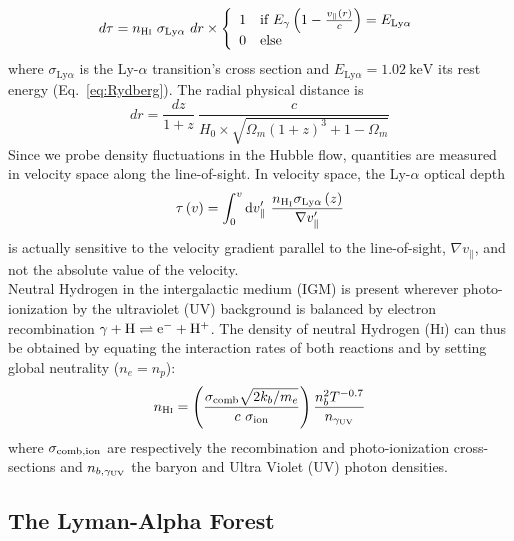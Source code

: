 \begin{equation}
\label{eq:beertlambert}
d\tau = n_{\mathrm{\textsc{Hi}}} ~\sigma_{\mathrm{Ly}\alpha} ~dr \times  \left\{
\begin{array}{ll}
1 & \text{if}~E_\gamma \left( 1 - \frac{v_\parallel (r)}{c} \right) = E_{\mathrm{Ly}\alpha} \\
0 & \text{else}
\end{array}
\right.
\end{equation} where $\sigma_{\mathrm{Ly}\alpha}$ is the Ly-$\alpha$ transition's cross section and $E_{\mathrm{Ly}\alpha} = 1.02~\mathrm{keV}$ its rest energy (Eq.~\ref{eq:Rydberg}). The radial physical distance is 
\begin{equation}
\label{eq:drdzbl}
dr = \frac{dz}{1+z}~\frac{c}{H_0 \times \sqrt{\Omega_m (1+z)^3 + 1 - \Omega_m}}
\end{equation} Since we probe density fluctuations in the Hubble flow, quantities are measured in velocity space along the line-of-sight. In velocity space, the Ly-$\alpha$ optical depth
\begin{equation}
	\tau \left(v\right) = \int_{0}^{v} \mathrm{d}v'_{\parallel} ~ \frac{n_{\rm{H_I}} \sigma_{\rm{Ly}\alpha}\left(z\right)}{\nabla v'_{\parallel}}
		\label{eq:tau}
\end{equation} is actually sensitive to the velocity gradient parallel to the line-of-sight, $\nabla v_{\parallel}$, and not the absolute value of the velocity. \\

Neutral Hydrogen in the intergalactic medium (IGM) is present wherever photo-ionization by the ultraviolet (UV) background is balanced by electron recombination $\gamma + \rm{H} \rightleftharpoons e^{-} + \rm{H}^{+}$. The density of neutral Hydrogen (\textsc{Hi}) can thus be obtained by equating the interaction rates of both reactions and by setting global neutrality ($n_e = n_p$):
\begin{equation}
	n_{\mathrm{\textsc{Hi}}} = \left( \frac{\sigma_{\mathrm{comb}} \sqrt{2 k_b/m_e}}{c ~\sigma_{\rm{ion}}} \right) \frac{n_b^2 T^{-0.7}}{n_{\gamma_{\rm{UV}}}}
		\label{eq:Hydrogen}
\end{equation} where $\sigma_{\rm{comb, ion}}$ are respectively the recombination and photo-ionization cross-sections and $n_{b, \gamma_{\rm{UV}}}$ the baryon and Ultra Violet (UV) photon densities. \\


\subsection{The Lyman-Alpha Forest}



